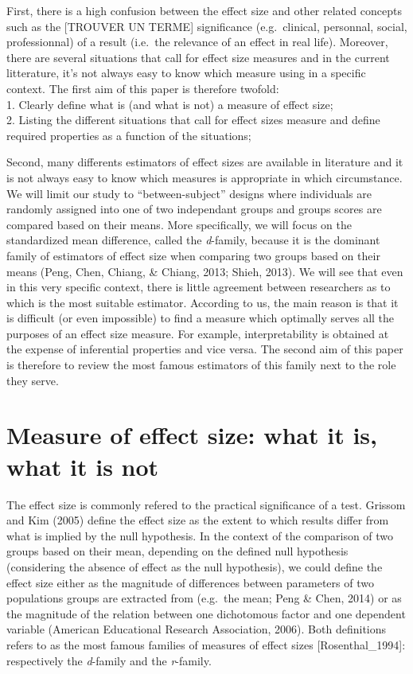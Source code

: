\documentclass[man]{apa6}
\begin{document}
First, there is a high confusion between the effect size and other related concepts such as the {[}TROUVER UN TERME{]} significance (e.g.~clinical, personnal, social, professionnal) of a result (i.e.~the relevance of an effect in real life). Moreover, there are several situations that call for effect size measures and in the current litterature, it's not always easy to know which measure using in a specific context. The first aim of this paper is therefore twofold:\\
1. Clearly define what is (and what is not) a measure of effect size;\\
2. Listing the different situations that call for effect sizes measure and define required properties as a function of the situations;

Second, many differents estimators of effect sizes are available in literature and it is not always easy to know which measures is appropriate in which circumstance. We will limit our study to \enquote{between-subject} designs where individuals are randomly assigned into one of two independant groups and groups scores are compared based on their means. More specifically, we will focus on the standardized mean difference, called the \emph{d}-family, because it is the dominant family of estimators of effect size when comparing two groups based on their means (Peng, Chen, Chiang, \& Chiang, 2013; Shieh, 2013). We will see that even in this very specific context, there is little agreement between researchers as to which is the most suitable estimator. According to us, the main reason is that it is difficult (or even impossible) to find a measure which optimally serves all the purposes of an effect size measure. For example, interpretability is obtained at the expense of inferential properties and vice versa. The second aim of this paper is therefore to review the most famous estimators of this family next to the role they serve.

\hypertarget{measure-of-effect-size-what-it-is-what-it-is-not}{%
\section{Measure of effect size: what it is, what it is not}\label{measure-of-effect-size-what-it-is-what-it-is-not}}

The effect size is commonly refered to the practical significance of a test. Grissom and Kim (2005) define the effect size as the extent to which results differ from what is implied by the null hypothesis. In the context of the comparison of two groups based on their mean, depending on the defined null hypothesis (considering the absence of effect as the null hypothesis), we could define the effect size either as the magnitude of differences between parameters of two populations groups are extracted from (e.g.~the mean; Peng \& Chen, 2014) or as the magnitude of the relation between one dichotomous factor and one dependent variable (American Educational Research Association, 2006). Both definitions refers to as the most famous families of measures of effect sizes {[}Rosenthal\_1994{]}: respectively the \emph{d}-family and the \emph{r}-family.
\end{document}
